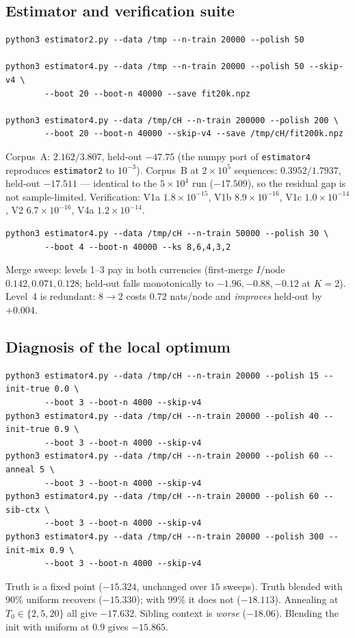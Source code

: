 \documentclass[11pt,a4paper]{article}
\theoremstyle{plain}
\theoremstyle{definition}
\begin{document}
\subsection*{Estimator and verification suite}

\begin{verbatim}
python3 estimator2.py --data /tmp --n-train 20000 --polish 50

python3 estimator4.py --data /tmp --n-train 20000 --polish 50 --skip-v4 \
        --boot 20 --boot-n 40000 --save fit20k.npz

python3 estimator4.py --data /tmp/cH --n-train 200000 --polish 200 \
        --boot 20 --boot-n 40000 --skip-v4 --save /tmp/cH/fit200k.npz
\end{verbatim}
Corpus~A: $2.162/3.807$, held-out $-47.75$ (the numpy port of
\texttt{estimator4} reproduces \texttt{estimator2} to $10^{-3}$).
Corpus~B at $2\times10^5$ sequences: $0.3952/1.7937$, held-out $-17.511$ ---
identical to the $5\times10^4$ run ($-17.509$), so the residual gap is not
sample-limited. Verification: V1a $1.8\times10^{-15}$, V1b $8.9\times10^{-16}$,
V1c $1.0\times10^{-14}$, V2 $6.7\times10^{-16}$, V4a $1.2\times10^{-14}$.

\begin{verbatim}
python3 estimator4.py --data /tmp/cH --n-train 50000 --polish 30 \
        --boot 4 --boot-n 40000 --ks 8,6,4,3,2
\end{verbatim}
Merge sweep: levels 1--3 pay in both currencies (first-merge $I/\text{node}$
$0.142, 0.071, 0.128$; held-out falls monotonically to $-1.96, -0.88, -0.12$ at
$K=2$). Level~4 is redundant: $8\to2$ costs $0.72$ nats/node and \emph{improves}
held-out by $+0.004$.

\subsection*{Diagnosis of the local optimum}

\begin{verbatim}
python3 estimator4.py --data /tmp/cH --n-train 20000 --polish 15 --init-true 0.0 \
        --boot 3 --boot-n 4000 --skip-v4
python3 estimator4.py --data /tmp/cH --n-train 20000 --polish 40 --init-true 0.9 \
        --boot 3 --boot-n 4000 --skip-v4
python3 estimator4.py --data /tmp/cH --n-train 20000 --polish 60 --anneal 5 \
        --boot 3 --boot-n 4000 --skip-v4
python3 estimator4.py --data /tmp/cH --n-train 20000 --polish 60 --sib-ctx \
        --boot 3 --boot-n 4000 --skip-v4
python3 estimator4.py --data /tmp/cH --n-train 20000 --polish 300 --init-mix 0.9 \
        --boot 3 --boot-n 4000 --skip-v4
\end{verbatim}
Truth is a fixed point ($-15.324$, unchanged over $15$ sweeps). Truth blended
with $90\%$ uniform recovers ($-15.330$); with $99\%$ it does not ($-18.113$).
Annealing at $T_0\in\{2,5,20\}$ all give $-17.632$. Sibling context is
\emph{worse} ($-18.06$). Blending the init with uniform at $0.9$ gives
$-15.865$.
\end{document}
